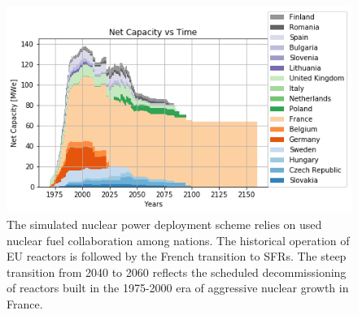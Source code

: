 \begin{frame}
\begin{figure}[htbp!]
    \begin{center}
        \includegraphics[width=\textwidth]{./images/onesim.png}
    \end{center}
    \caption{The simulated nuclear power deployment scheme relies on used
        nuclear fuel collaboration among nations.
        The historical operation of EU reactors is followed by the French transition to SFRs.  The steep transition from 2040 to 2060 reflects the scheduled decommissioning of reactors built in the 1975-2000 era of aggressive nuclear growth in France.}
    \label{fig:tot_dep}
\end{figure}
\end{frame}

